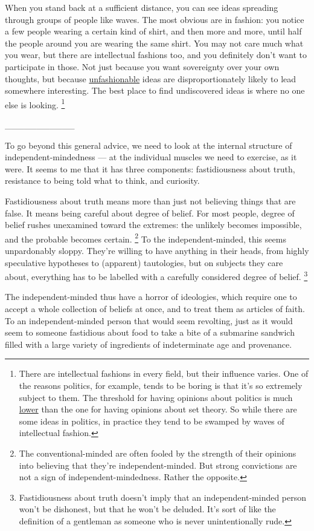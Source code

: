 When you stand back at a sufficient distance, you can see ideas
spreading through groups of people like waves. The most obvious are in
fashion: you notice a few people wearing a certain kind of shirt, and
then more and more, until half the people around you are wearing the
same shirt. You may not care much what you wear, but there are
intellectual fashions too, and you definitely don't want to participate
in those. Not just because you want sovereignty over your own thoughts,
but because \href{nov.html}{unfashionable} ideas are disproportionately
likely to lead somewhere interesting. The best place to find
undiscovered ideas is where no one else is looking.
\footnote{There are intellectual fashions in every field, but their
influence varies. One of the reasons politics, for example, tends to be
boring is that it's so extremely subject to them. The threshold for
having opinions about politics is much \href{identity.html}{lower} than
the one for having opinions about set theory. So while there are some
ideas in politics, in practice they tend to be swamped by waves of
intellectual fashion.}

\_\_\_\_\_\_\_\_\_\_\_

To go beyond this general advice, we need to look at the internal
structure of independent-mindedness --- at the individual muscles we
need to exercise, as it were. It seems to me that it has three
components: fastidiousness about truth, resistance to being told what to
think, and curiosity.

Fastidiousness about truth means more than just not believing things
that are false. It means being careful about degree of belief. For most
people, degree of belief rushes unexamined toward the extremes: the
unlikely becomes impossible, and the probable becomes certain.
\footnote{The conventional-minded are often fooled by the strength of
their opinions into believing that they're independent-minded. But
strong convictions are not a sign of independent-mindedness. Rather the
opposite.} To the independent-minded, this seems
unpardonably sloppy. They're willing to have anything in their heads,
from highly speculative hypotheses to (apparent) tautologies, but on
subjects they care about, everything has to be labelled with a carefully
considered degree of belief. \footnote{Fastidiousness about truth doesn't imply that an
independent-minded person won't be dishonest, but that he won't be
deluded. It's sort of like the definition of a gentleman as someone who
is never unintentionally rude.}

The independent-minded thus have a horror of ideologies, which require
one to accept a whole collection of beliefs at once, and to treat them
as articles of faith. To an independent-minded person that would seem
revolting, just as it would seem to someone fastidious about food to
take a bite of a submarine sandwich filled with a large variety of
ingredients of indeterminate age and provenance.

